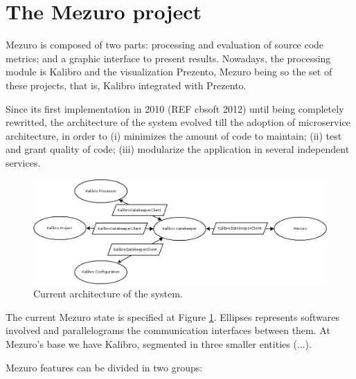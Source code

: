 \documentclass{llncs}
\begin{document}
\section{The Mezuro project}
\label{sec:mezuro}

Mezuro is composed of two parts: processing and evaluation of source code
metrics; and a graphic interface to present results. Nowadays, the processing
module is Kalibro and the visualization Prezento, Mezuro being so the set of
these projects, that is, Kalibro integrated with Prezento.

Since its first implementation in 2010 (REF cbsoft 2012) until being completely
rewritted, the architecture of the system evolved till the adoption of 
microservice architecture, in order to (i) minimizes the amount of code to
maintain;
(ii) test and grant quality of code;
(iii) modularize the application in several independent services.

\begin{figure}[H]
  \centering
    \includegraphics[width=\textwidth]{images/mezuro-architecture-predicted.png}
  \caption{Current architecture of the system.}
  \label{fig:architecture-2}
\end{figure}


The current Mezuro state is specified at Figure \ref{fig:architecture-2}. Ellipses represents
softwares involved and parallelograms the communication interfaces between them. At Mezuro's
base we have Kalibro, segmented in three smaller entities (...).

Mezuro features can be divided in two groups:
\end{document}
